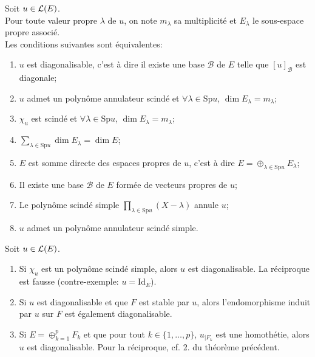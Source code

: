 \documentclass[a4paper]{book}
\begin{document}
\begin{Theoreme}
Soit $u\in \mathcal{L}(E)$.\\
Pour toute valeur propre $\lambda    $ de $u$, on note $m_\lambda    $ sa multiplicité et $E_\lambda    $ le sous-espace propre associé.\\
Les conditions suivantes sont équivalentes:
\begin{enumerate}
\item $u$ est diagonalisable, c'est à dire  il existe une base $\mathcal{B} $ de $E$ telle que $[u]_\mathcal{B} $ est diagonale;
\item $u$ admet un polynôme annulateur scindé et $\forall   \lambda    \in \mathrm{Sp} u$, $\dim E_\lambda    = m_\lambda    $;
\item $\chi       _u$ est scindé et $\forall   \lambda    \in \mathrm{Sp} u$, $\dim E_\lambda    = m_\lambda    $;
\item $\sum_{\lambda    \in \mathrm{Sp} u} \dim E_\lambda     = \dim E$;
\item $E$ est somme directe des espaces propres de $u$, c'est à dire  $E = \oplus     _{\lambda    \in \mathrm{Sp} u} E_\lambda    $;
\item Il existe une base $\mathcal{B} $ de $E$ formée de vecteurs propres de $u$;
\item Le polynôme scindé simple $\prod_{\lambda    \in \mathrm{Sp} u}(X-\lambda    )$ annule $u$;
\item $u$ admet un polynôme annulateur scindé simple.
\end{enumerate}
\end{Theoreme}


\begin{Corollaire}
Soit $u\in \mathcal{L}(E)$.
\begin{enumerate}
\item Si $\chi       _u$ est un polynôme scindé simple, alors $u$ est diagonalisable.
  La réciproque est fausse (contre-exemple: $u = \mathrm{Id}_E$).
\item Si $u$ est diagonalisable et que $F$ est stable par $u$, alors l'endomorphisme induit par $u$ sur $F$ est également diagonalisable.
\item Si $E = \oplus_{k=1}^p F_k$ et que pour tout $k\in \{1,\dots,p\}$, $u_{\vert F_k}$ est une homothétie, alors $u$ est diagonalisable.
  Pour la réciproque, cf. 2. du théorème précédent.
\end{enumerate}
\end{Corollaire}
\end{document}
